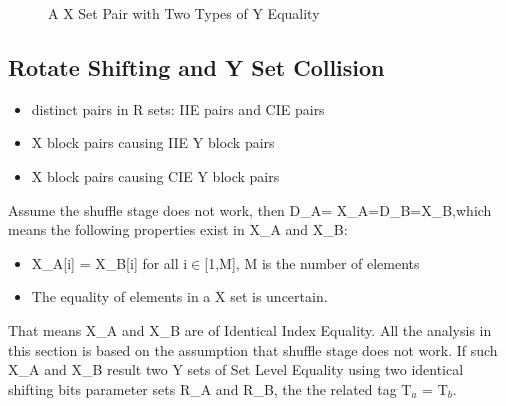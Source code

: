 \documentclass{article}
\begin{document}
\begin{figure}
\centering
{}
\caption{A X Set Pair with Two Types of Y Equality}
 \label{fig:y_both} %
\end{figure}

\subsection{Rotate Shifting and Y Set Collision} 
\begin{itemize}
	\item distinct pairs in R sets: IIE pairs and CIE pairs
	\item X block pairs causing IIE Y block pairs
	\item X block pairs causing CIE Y block pairs
\end{itemize}
Assume the shuffle stage does not work, then D\_A= X\_A=D\_B=X\_B,which means the following properties exist in X\_A and X\_B:
\begin{itemize}
	\item X\_A[i] = X\_B[i] for all i$\in$[1,M], M is the number of elements
	\item The equality of elements in a X set is uncertain.
\end{itemize}
That means X\_A and X\_B are of Identical Index Equality. 
All the analysis in this section is based on the assumption that shuffle stage does not work.
If such X\_A and X\_B result two Y sets of Set Level Equality using two identical shifting bits parameter sets R\_A and R\_B, the the related tag T$_a$ = T$_b$.
 
\end{document}
